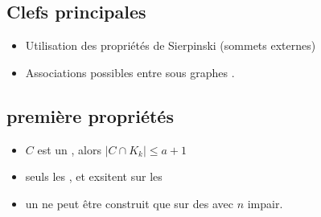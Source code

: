 \documentclass{beamer}
\begin{document}
\renewcommand{\subSecName}{Clefs principales}
\subsection{\subSecName}

\begin{myframe}
    \begin{itemize}
        \item Utilisation des propri\'et\'es de Sierpinski (sommets externes)
        \item Associations possibles entre sous graphes \Kc.
    \end{itemize} 
\end{myframe}

\renewcommand{\subSecName}{premi\`ere propri\'et\'es}
\subsection{\subSecName}
\begin{myframe}
    \begin{itemize}
        \item $C$ est un \ABc, alors $ \mid C \cap K_{k} \mid \leq a + 1$
        \item seuls les ,  et  exsitent sur les \Sgs
        \item un  ne peut être construit que sur des \Snk avec $n$ impair.
    \end{itemize}
\end{myframe}
\end{document}
